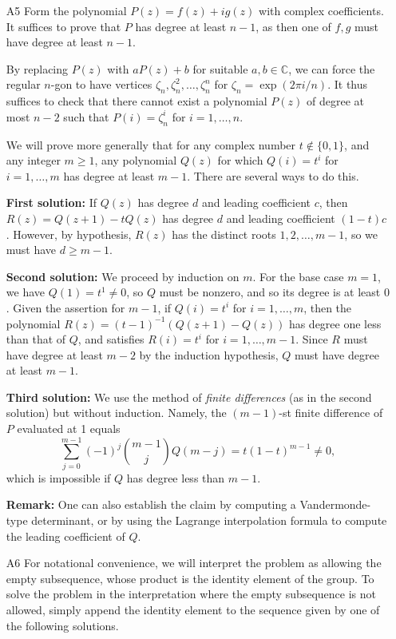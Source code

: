\documentclass[amssymb,twocolumn,pra,10pt,aps]{revtex4-1}
\newcommand{\CC}{\mathbb{C}}
\begin{document}
\begin{itemize}
\item[A5]
Form the polynomial $P(z) = f(z) + i g(z)$ with complex coefficients.
It suffices to prove that $P$ has degree at least $n-1$, as then one
of $f, g$ must have degree at least $n-1$.

By replacing $P(z)$ with $a P(z) + b$ for suitable $a,b \in \CC$,
we can force the regular $n$-gon to have vertices
$\zeta_n, \zeta_n^2, \dots, \zeta_n^n$ for
$\zeta_n = \exp(2 \pi i/n)$. It thus suffices to check that
there cannot exist a polynomial $P(z)$ of degree at most $n-2$
such that $P(i) = \zeta_n^i$ for $i=1,\dots,n$.

We will prove more generally that for any complex number
$t \notin \{0,1\}$, and any integer $m \geq 1$,
any polynomial $Q(z)$ for which
$Q(i) = t^i$ for $i=1,\dots,m$ has degree at least $m-1$.
There are several ways to do this.

\textbf{First solution:}
If $Q(z)$ has degree $d$ and leading coefficient $c$,
then $R(z) = Q(z+1) - t Q(z)$ has degree $d$ and leading coefficient $(1-t)c$.
However, by hypothesis, $R(z)$ has the distinct roots
$1,2,\dots,m-1$, so we must have $d \geq m-1$.

\textbf{Second solution:}
We proceed by induction on $m$.
For the base case $m=1$, we have $Q(1) = t^1 \neq 0$,
so $Q$ must be nonzero, and so its degree is at least $0$.
Given the assertion for $m-1$, if $Q(i) = t^i$ for $i=1,\dots,m$,
then the polynomial $R(z) = (t-1)^{-1} (Q(z+1) - Q(z))$ has degree
one less than that of $Q$,
and satisfies $R(i) = t^i$ for $i=1,\dots,m-1$. Since $R$ must have
degree at least $m-2$ by the induction hypothesis, $Q$ must have
degree at least $m-1$.

\textbf{Third solution:}
We use the method of \emph{finite differences} (as in the second
solution) but without induction. Namely,
the $(m-1)$-st finite difference
of $P$ evaluated at 1 equals
\[
\sum_{j=0}^{m-1} (-1)^j \binom{m-1}{j} Q(m-j)
= t(1 - t)^{m-1} \neq 0,
\]
which is impossible if $Q$ has degree less than $m-1$.

\textbf{Remark:} One can also establish the claim by computing
a Vandermonde-type determinant, or by using the Lagrange interpolation
formula to compute the leading coefficient of $Q$.

\item[A6]
For notational convenience, we will interpret the problem as
allowing the empty subsequence, whose product is the identity element of
the group. To solve the problem in the interpretation where the empty
subsequence is not allowed, simply append the identity element to the sequence
given by one of the following solutions.


\end{itemize}
\end{document}
